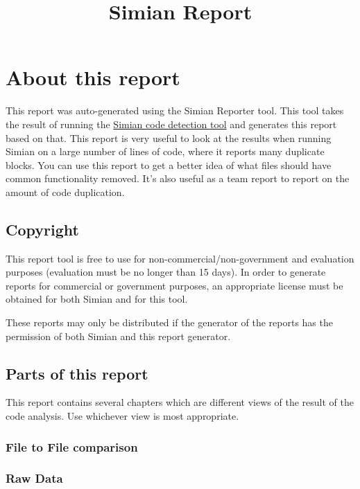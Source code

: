 \documentclass{report}[10pt]
\title{Simian Report}
\begin{document}
\maketitle

\tableofcontents


\chapter{About this report}

This report was auto-generated using the Simian Reporter tool. This tool takes the result of running the \href{http://www.harukizaemon.com/simian/index.html}{Simian code detection tool} and generates this report based on that. This report is very useful to look at the results when running Simian on a large number of lines of code, where it reports many duplicate blocks. You can use this report to get a better idea of what files should have common functionality removed. It's also useful as a team report to report on the amount of code duplication.

\section{Copyright}

This report tool is free to use for non-commercial/non-government and evaluation purposes (evaluation must be no longer than 15 days). In order to generate reports for commercial or government purposes, an appropriate license must be obtained for both Simian and for this tool.

These reports may only be distributed if the generator of the reports has the permission of both Simian and this report generator.

\section{Parts of this report}

This report contains several chapters which are different views of the result of the code analysis. Use whichever view is most appropriate.

\subsection{File to File comparison}

\subsection{Raw Data}
\end{document}
